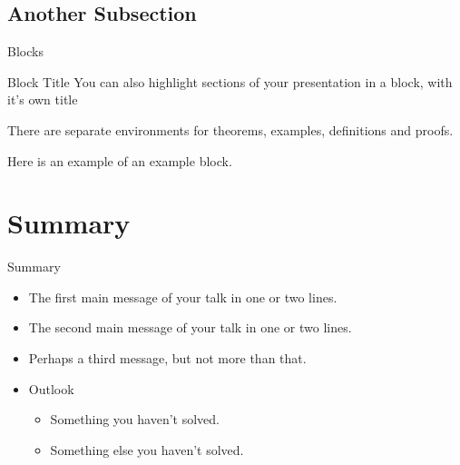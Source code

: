\documentclass{beamer}
\begin{document}
\subsection{Another Subsection}

\begin{frame}{Blocks}
\begin{block}{Block Title}
You can also highlight sections of your presentation in a block, with it's own title
\end{block}
\begin{theorem}
There are separate environments for theorems, examples, definitions and proofs.
\end{theorem}
\begin{example}
Here is an example of an example block.
\end{example}
\end{frame}

\section*{Summary}

\begin{frame}{Summary}
  \begin{itemize}
  \item
    The \alert{first main message} of your talk in one or two lines.
  \item
    The \alert{second main message} of your talk in one or two lines.
  \item
    Perhaps a \alert{third message}, but not more than that.
  \end{itemize}
  
  \begin{itemize}
  \item
    Outlook
    \begin{itemize}
    \item
      Something you haven't solved.
    \item
      Something else you haven't solved.
    \end{itemize}
  \end{itemize}
\end{frame}



\appendix
\end{document}
